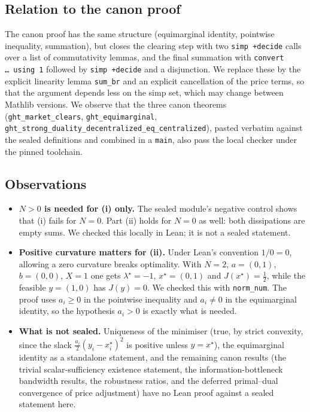\documentclass[11pt]{article}
\theoremstyle{definition}
\theoremstyle{remark}
\begin{document}
\subsection{Relation to the canon proof}
The canon proof has the same structure (equimarginal identity, pointwise inequality, summation), but closes the clearing step
with two \texttt{simp +decide} calls over a list of commutativity lemmas, and the final summation with \texttt{convert \ldots\ using 1}
followed by \texttt{simp +decide} and a disjunction.
We replace these by the explicit linearity lemma \texttt{sum\_br} and an explicit cancellation of the price terms, so that the
argument depends less on the simp set, which may change between Mathlib versions.
We observe that the three canon theorems (\texttt{ght\_market\_clears}, \texttt{ght\_equimarginal},
\texttt{ght\_strong\_duality\_decentralized\_eq\_centralized}), pasted verbatim against the sealed definitions and combined in a
\texttt{main}, also pass the local checker under the pinned toolchain.

\subsection{Observations}
\begin{itemize}
\item \textbf{$N>0$ is needed for (i) only.} The sealed module's negative control shows that (i) fails for $N=0$.
Part (ii) holds for $N=0$ as well: both dissipations are empty sums. We checked this locally in Lean; it is not a sealed statement.
\item \textbf{Positive curvature matters for (ii).} Under Lean's convention $1/0=0$, allowing a zero curvature breaks optimality.
With $N=2$, $a=(0,1)$, $b=(0,0)$, $X=1$ one gets $\lambda^\star=-1$, $x^\star=(0,1)$ and $J(x^\star)=\tfrac12$, while the feasible
$y=(1,0)$ has $J(y)=0$. We checked this with \texttt{norm\_num}. The proof uses $a_i\ge0$ in the pointwise inequality and $a_i\ne0$ in the
equimarginal identity, so the hypothesis $a_i>0$ is exactly what is needed.
\item \textbf{What is not sealed.} Uniqueness of the minimiser (true, by strict convexity, since the slack $\tfrac{a_i}{2}(y_i-x^\star_i)^2$ is
positive unless $y=x^\star$), the equimarginal identity as a standalone statement, and the remaining canon results
(the trivial scalar-sufficiency existence statement, the information-bottleneck bandwidth results, the robustness ratios, and the
deferred primal--dual convergence of price adjustment) have no Lean proof against a sealed statement here.
\end{itemize}
\end{document}
